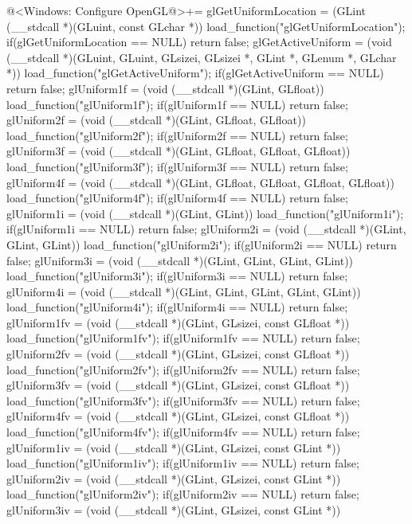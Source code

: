 \iniciocodigo
@<Windows: Configure OpenGL@>+=
glGetUniformLocation = (GLint (__stdcall *)(GLuint, const GLchar *))
                            load_function("glGetUniformLocation");
if(glGetUniformLocation == NULL) return false;
glGetActiveUniform = (void (__stdcall *)(GLuint, GLuint, GLsizei, GLsizei *,
                                         GLint *, GLenum *, GLchar *))
                      load_function("glGetActiveUniform");
if(glGetActiveUniform == NULL) return false;
glUniform1f = (void (__stdcall *)(GLint, GLfloat)) load_function("glUniform1f");
if(glUniform1f == NULL) return false;
glUniform2f = (void (__stdcall *)(GLint, GLfloat, GLfloat))
               load_function("glUniform2f");
if(glUniform2f == NULL) return false;
glUniform3f = (void (__stdcall *)(GLint, GLfloat, GLfloat, GLfloat))
                        load_function("glUniform3f");
if(glUniform3f == NULL) return false;
glUniform4f = (void (__stdcall *)(GLint, GLfloat, GLfloat, GLfloat, GLfloat))
                        load_function("glUniform4f");
if(glUniform4f == NULL) return false;
glUniform1i = (void (__stdcall *)(GLint, GLint)) load_function("glUniform1i");
if(glUniform1i == NULL) return false;
glUniform2i = (void (__stdcall *)(GLint, GLint, GLint))
               load_function("glUniform2i");
if(glUniform2i == NULL) return false;
glUniform3i = (void (__stdcall *)(GLint, GLint, GLint, GLint))
               load_function("glUniform3i");
if(glUniform3i == NULL) return false;
glUniform4i = (void (__stdcall *)(GLint, GLint, GLint, GLint, GLint))
                 load_function("glUniform4i");
if(glUniform4i == NULL) return false;
glUniform1fv = (void (__stdcall *)(GLint, GLsizei, const GLfloat *))
                 load_function("glUniform1fv");
if(glUniform1fv == NULL) return false;
glUniform2fv = (void (__stdcall *)(GLint, GLsizei, const GLfloat *))
                 load_function("glUniform2fv");
if(glUniform2fv == NULL) return false;
glUniform3fv = (void (__stdcall *)(GLint, GLsizei, const GLfloat *))
                 load_function("glUniform3fv");
if(glUniform3fv == NULL) return false;
glUniform4fv = (void (__stdcall *)(GLint, GLsizei, const GLfloat *))
                 load_function("glUniform4fv");
if(glUniform4fv == NULL) return false;
glUniform1iv = (void (__stdcall *)(GLint, GLsizei, const GLint *))
                 load_function("glUniform1iv");
if(glUniform1iv == NULL) return false;
glUniform2iv = (void (__stdcall *)(GLint, GLsizei, const GLint *))
                 load_function("glUniform2iv");
if(glUniform2iv == NULL) return false;
glUniform3iv = (void (__stdcall *)(GLint, GLsizei, const GLint *))
